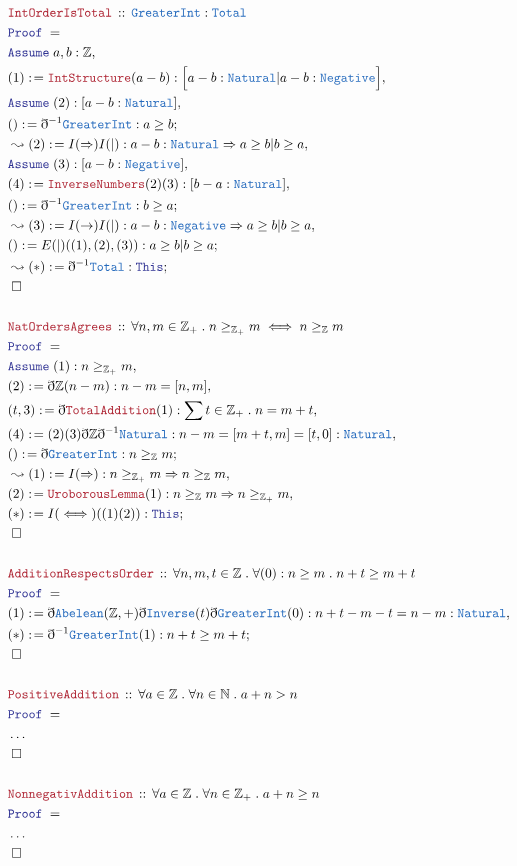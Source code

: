 \documentclass[12pt]{scrartcl}
\newcommand{\TYPE}[1]{\textcolor{NavyBlue}{\mathtt{#1}}}
\newcommand{\LOGIC}[1]{\textcolor{Blue}{\mathtt{#1}}}
\newcommand{\THM}[1]{\textcolor{Maroon}{\mathtt{#1}}}
\renewcommand{\.}{\; . \;}
\newcommand{\de}{: \kern 0.1pc =}
\newcommand{\Theorem}[2]{& \THM{#1} \, :: \, #2 \\ & \Proof = \\ }
\newcommand{\Page}[1]{ \begin{align*} #1 \end{align*}   }
\newcommand{ \bd }{ \ByDef }
\newcommand{\NoProof}{ & \ldots \\ \EndProof}
\newcommand{\Int}{\mathbb{Z} }
\newcommand{\Nat}{\mathbb{N} }
\newcommand{\Say}[3]{& #1 \de #2 : #3, \\}
\newcommand{\Conclude}[3]{& #1 \de #2 : #3; \\}
\newcommand{\Derive}[3]{& \leadsto #1 \de #2 : #3, \\}
\newcommand{\DeriveConclude}[3]{& \leadsto #1 \de #2 : #3 ; \\}
\newcommand{\Assume}[2]{& \LOGIC{Assume} \; #1 : #2, \\}
\newcommand{\QED}{\; \square}
\newcommand{\EndProof}{& \QED \\}
\newcommand{\ByDef}{\eth}
\newcommand{\Proof}{\LOGIC{Proof} \; }
\begin{document}
\Page{
	\Theorem{IntOrderIsTotal}{\TYPE{GreaterInt} : \TYPE{Total}}
	\Assume{a,b}{\Int}
	\Say{(1)}{\THM{IntStructure}(a - b)}{ \Big[ a - b : \TYPE{Natural} | a - b :   \TYPE{Negative} \Big]}
	\Assume{(2)}{ [a - b : \TYPE{Natural}]}
	\Conclude{()}{\bd^{-1} \TYPE{GreaterInt}}{ a \ge b} 
	\Derive{(2)}{I(\Rightarrow)I(|)}{a - b : \TYPE{Natural}  \Rightarrow a \ge b | b \ge a}
	\Assume{(3)}{[a-b : \TYPE{Negative}]}
	\Say{(4)}{\THM{InverseNumbers}(2)(3)}{[b-a : \TYPE{Natural}]}
	\Conclude{()}{\bd^{-1} \TYPE{GreaterInt}}{b \ge a}               
	\Derive{(3)}{I(\rightarrow)I(|)}{a -b : \TYPE{Negative} \Rightarrow a \ge b | b \ge a}
	\Conclude{()}{E(|)((1),(2),(3))}{a \ge b | b \ge a}
	\DeriveConclude{(*)}{\bd^{-1}\TYPE{Total}}{\LOGIC{This}}
	\EndProof
	\\
	\Theorem{NatOrdersAgrees}{\forall n,m \in \Int_+ \. n \ge_{\Int_+} m \iff n \ge_{\Int} m}
	\Assume{(1)}{n \ge_{\Int_+} m}
	\Say{(2)}{\bd \Int(n-m)}{ n - m =  [n, m] }
	\Say{(t,3)}{\bd \THM{TotalAddition}(1)}{\sum t \in \Int_+ \. n = m + t}
	\Say{(4)}{ (2)(3)\bd \Int\bd^{-1} \TYPE{Natural} }{ n - m = [m + t,m] = [t,0] : \TYPE{Natural}  }
	\Conclude{ () }{ \bd \TYPE{GreaterInt} }{ n \ge_{\Int} m}
	\Derive{(1)}{I(\Rightarrow)}{ n \ge_{\Int_+} m \Rightarrow n \ge_{\Int} m  }
	\Say{(2)}{\THM{UroborousLemma}(1)}{ n \ge_{\Int} m \Rightarrow n \ge_{\Int_+} m  }
	\Conclude{(*)}{I(\iff)((1)(2))}{\LOGIC{This}}
	\EndProof
	\\
	\Theorem{AdditionRespectsOrder}{\forall n,m,t \in \Int \. \forall (0) : n \ge m \. n + t \ge m + t}
	\Say{(1)}{\bd \TYPE{Abelean}(\Int, +)\bd \TYPE{Inverse}(t)\bd \TYPE{GreaterInt}(0)}{ n + t - m - t = n -m : \TYPE{Natural} }
	\Conclude{(*)}{\bd^{-1} \TYPE{GreaterInt}(1) }{ n + t \ge m + t  }
	\EndProof
	\\
	\Theorem{PositiveAddition}{\forall a \in \Int \. \forall n \in \Nat \. a + n > n}
	\NoProof
	\\
	\Theorem{NonnegativAddition}{\forall a \in \Int \. \forall n \in \Int_+ \. a + n \ge n}
	\NoProof
}
\newpage
\end{document}
